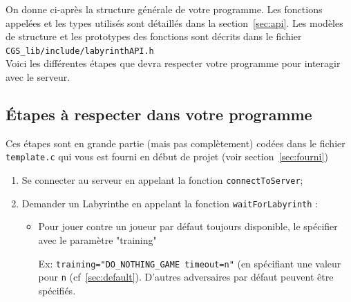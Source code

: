 \documentclass[french,12pt,a4paper,twoside,openright,titlepage]{report}
\begin{document}
On donne ci-après la structure générale de votre programme. Les fonctions appelées et les types utilisés sont détaillés
dans la section~\ref{sec:api}.  Les modèles de structure et les prototypes des fonctions sont décrits dans le fichier 
\verb|CGS_lib/include/labyrinthAPI.h|\\
Voici les différentes étapes que devra respecter votre programme pour interagir avec le serveur.

\subsection{Étapes à respecter dans votre programme}
\label{sec:sequences}
Ces étapes sont en grande partie (mais pas complètement) codées dans le fichier \verb|template.c| qui vous est fourni en début de projet (voir section~\ref{sec:fourni})
\begin{enumerate}
\item Se connecter au serveur en appelant la fonction \verb|connectToServer|;
\item Demander un Labyrinthe en appelant la fonction \verb|waitForLabyrinth| :
\begin{itemize}
\item Pour jouer contre un joueur par défaut toujours disponible, le spécifier avec le paramètre "training"

Ex: \texttt{training="DO\_NOTHING\_GAME timeout=n"} (en spécifiant une valeur pour \verb|n| (cf~\ref{sec:default}). D'autres adversaires par défaut peuvent être spécifiés. 


\end{itemize}
\end{enumerate}
\end{document}
